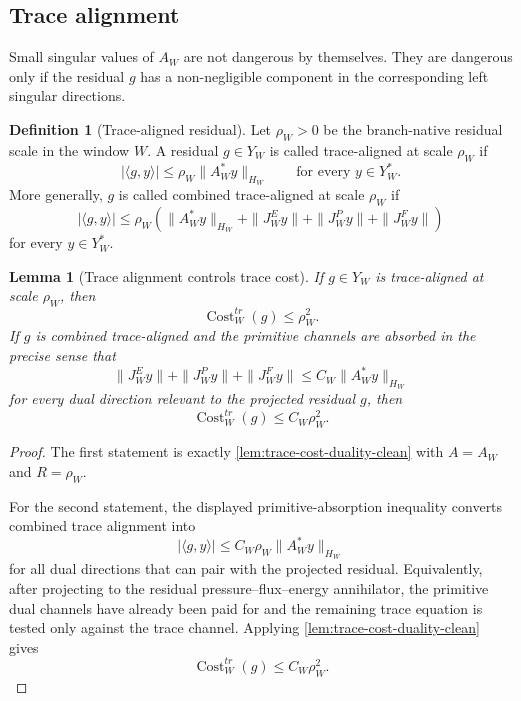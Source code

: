 \documentclass[11pt]{article}
\numberwithin{equation}{section}
\theoremstyle{plain}
\newtheorem{lemma}[theorem]{Lemma}
\theoremstyle{definition}
\newtheorem{definition}[theorem]{Definition}
\theoremstyle{remark}
\begin{document}
\subsection{Trace alignment}

Small singular values of \(A_W\) are not dangerous by themselves.  They are
dangerous only if the residual \(g\) has a non-negligible component in the
corresponding left singular directions.

\begin{definition}[Trace-aligned residual]
\label{def:trace-aligned-residual}
Let \(\rho_W>0\) be the branch-native residual scale in the window \(W\).
A residual \(g\in Y_W\) is called trace-aligned at scale \(\rho_W\) if
\[
        |\langle g,y\rangle|
        \le
        \rho_W\|A_W^*y\|_{H_W}
        \qquad
        \text{for every }y\in Y_W^*.
\]
More generally, \(g\) is called combined trace-aligned at scale \(\rho_W\) if
\[
        |\langle g,y\rangle|
        \le
        \rho_W
        \left(
            \|A_W^*y\|_{H_W}
            +
            \|J^E_Wy\|
            +
            \|J^P_Wy\|
            +
            \|J^F_Wy\|
        \right)
\]
for every \(y\in Y_W^*\).
\end{definition}

\begin{lemma}[Trace alignment controls trace cost]
\label{lem:trace-alignment-controls-cost}
If \(g\in Y_W\) is trace-aligned at scale \(\rho_W\), then
\[
        \operatorname{Cost}^{tr}_W(g)\le \rho_W^2.
\]
If \(g\) is combined trace-aligned and the primitive channels are absorbed in the precise sense that
\[
        \|J^E_Wy\|+\|J^P_Wy\|+\|J^F_Wy\|
        \le
        C_W\|A_W^*y\|_{H_W}
\]
for every dual direction relevant to the projected residual \(g\), then
\[
        \operatorname{Cost}^{tr}_W(g)\le C_W\rho_W^2.
\]
\end{lemma}

\begin{proof}
The first statement is exactly
\cref{lem:trace-cost-duality-clean} with \(A=A_W\) and \(R=\rho_W\).

For the second statement, the displayed primitive-absorption inequality converts combined trace alignment into
\[
        |\langle g,y\rangle|
        \le
        C_W\rho_W\|A_W^*y\|_{H_W}
\]
for all dual directions that can pair with the projected residual.  Equivalently, after projecting to the residual pressure--flux--energy annihilator, the primitive dual channels have already been paid for and the remaining trace equation is tested only against the trace channel.  Applying \cref{lem:trace-cost-duality-clean} gives
\[
        \operatorname{Cost}^{tr}_W(g)
        \le
        C_W\rho_W^2.
\]
\end{proof}
\end{document}
